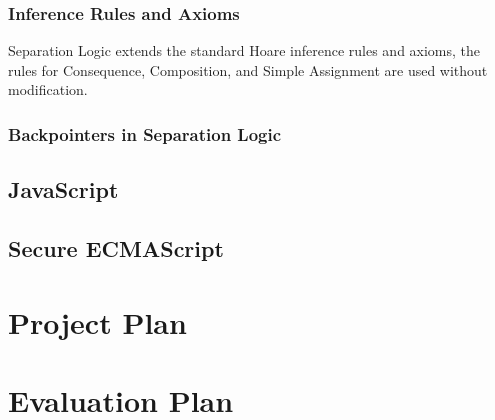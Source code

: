 \documentclass[a4paper]{report}
\begin{document}
  \subsection{Inference Rules and Axioms}

  Separation Logic extends the standard Hoare inference rules and axioms, the
  rules for Consequence, Composition, and Simple Assignment are used without
  modification.

  \subsection{Backpointers in Separation Logic}

\section{JavaScript}

\section{Secure ECMAScript}

\chapter{Project Plan}

\chapter{Evaluation Plan}
% 



\end{document}
